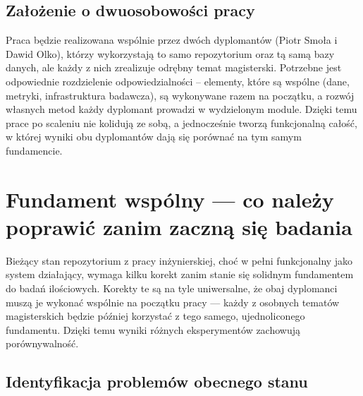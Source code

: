 \documentclass[12pt,a4paper]{article}
\begin{document}
\subsection*{Założenie o dwuosobowości pracy}

Praca będzie realizowana wspólnie przez dwóch dyplomantów (Piotr Smoła i Dawid Olko), którzy wykorzystają to samo repozytorium oraz tą samą bazy danych, ale każdy z nich zrealizuje odrębny temat magisterski. Potrzebne jest odpowiednie rozdzielenie odpowiedzialności -- elementy, które są wspólne (dane, metryki, infrastruktura badawcza), są wykonywane razem na początku, a rozwój własnych metod każdy dyplomant prowadzi w wydzielonym module. Dzięki temu prace po scaleniu nie kolidują ze sobą, a jednocześnie tworzą funkcjonalną całość, w której wyniki obu dyplomantów dają się porównać na tym samym fundamencie.


\section{Fundament wspólny --- co należy poprawić zanim zaczną się badania}

Bieżący stan repozytorium z pracy inżynierskiej, choć w pełni funkcjonalny jako system działający, wymaga kilku korekt zanim stanie się solidnym fundamentem do badań ilościowych. Korekty te są na tyle uniwersalne, że obaj dyplomanci muszą je wykonać wspólnie na początku pracy --- każdy z osobnych tematów magisterskich będzie później korzystać z tego samego, ujednoliconego fundamentu. Dzięki temu wyniki różnych eksperymentów zachowują porównywalność.

\subsection*{Identyfikacja problemów obecnego stanu}
\end{document}
